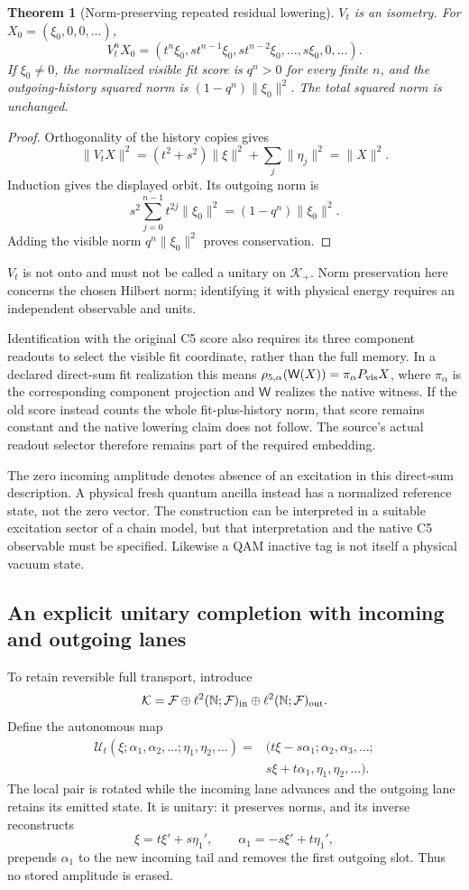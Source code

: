 \documentclass[11pt,a4paper]{article}
\newtheorem{theorem}{Theorem}
\begin{document}
\begin{theorem}[Norm-preserving repeated residual lowering]
\label{thm:shift-memory-lowering}
$V_t$ is an isometry. For $X_0=(\xi_0,0,0,\ldots)$,
\[
 V_t^nX_0=
 (t^n\xi_0,st^{n-1}\xi_0,st^{n-2}\xi_0,\ldots,s\xi_0,0,\ldots).
\]
If $\xi_0\ne0$, the normalized visible fit score is $q^n>0$ for
every finite $n$, and the outgoing-history squared norm is
$(1-q^n)\|\xi_0\|^2$. The total squared norm is unchanged.
\end{theorem}
\begin{proof}
Orthogonality of the history copies gives
\[
 \|V_tX\|^2=(t^2+s^2)\|\xi\|^2+\sum_j\|\eta_j\|^2=\|X\|^2.
\]
Induction gives the displayed orbit. Its outgoing norm is
\[
 s^2\sum_{j=0}^{n-1}t^{2j}\|\xi_0\|^2
 =(1-q^n)\|\xi_0\|^2.
\]
Adding the visible norm $q^n\|\xi_0\|^2$ proves conservation.
\end{proof}
$V_t$ is not onto and must not be called a unitary on $\mathcal K_+$.
Norm preservation here concerns the chosen Hilbert norm; identifying it
with physical energy requires an independent observable and units.

Identification with the original C5 score also requires its three
component readouts to select the visible fit coordinate, rather than
the full memory. In a declared direct-sum fit realization this means
$\rho_{5,\alpha}(\mathsf W(X))=\pi_\alpha P_{\rm vis}X$, where
$\pi_\alpha$ is the corresponding component projection and
$\mathsf W$ realizes the native witness. If the old score instead
counts the whole fit-plus-history norm, that score remains constant
and the native lowering claim does not follow. The source's actual
readout selector therefore remains part of the required embedding.

The zero incoming amplitude denotes absence of an excitation in this
direct-sum description. A physical fresh quantum ancilla instead has
a normalized reference state, not the zero vector. The construction can
be interpreted in a suitable excitation sector of a chain model, but
that interpretation and the native C5 observable must be specified.
Likewise a QAM inactive tag is not itself a physical vacuum state.

\subsection{An explicit unitary completion with incoming and outgoing lanes}
To retain reversible full transport, introduce
\[
 \mathcal K=
 \mathcal F\oplus\ell^2(\mathbb N;\mathcal F)_{\rm in}
 \oplus\ell^2(\mathbb N;\mathcal F)_{\rm out}.
\]
Define the autonomous map
\[
 \begin{aligned}
 \mathcal U_t(\xi;\alpha_1,\alpha_2,\ldots;\eta_1,\eta_2,\ldots)
 ={}&(t\xi-s\alpha_1;\alpha_2,\alpha_3,\ldots;\\
     &s\xi+t\alpha_1,\eta_1,\eta_2,\ldots).
 \end{aligned}
\]
The local pair is rotated while the incoming lane advances and the
outgoing lane retains its emitted state. It is unitary: it preserves
norms, and its inverse reconstructs
\[
 \xi=t\xi'+s\eta_1',\qquad
 \alpha_1=-s\xi'+t\eta_1',
\]
prepends $\alpha_1$ to the new incoming tail and removes the first
outgoing slot. Thus no stored amplitude is erased.
\end{document}

